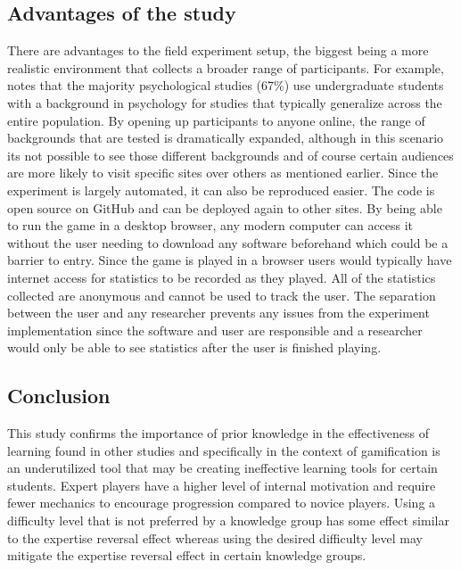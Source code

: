 \documentclass[letterpaper,man,natbib,floatsintext]{apa7}  %
\begin{document}
\subsection{Advantages of the study}
There are advantages to the field experiment setup, the biggest being a more realistic environment that collects a broader range of participants. For example, \cite{henrich2010weirdest} notes that the majority psychological studies (67\%)
use undergraduate students with a background in psychology for studies that typically generalize across the entire population. By opening up participants to anyone online, the range of backgrounds that are tested is dramatically expanded, although in this scenario its not possible to see those different backgrounds and of course certain audiences are more likely to visit specific sites over others as mentioned earlier. Since the experiment is largely automated, it
can also be reproduced easier. The code is open source on GitHub and can be deployed again to other sites. By being able 
to run the game in a desktop browser, any modern computer can access it without the user needing to download any software
beforehand which could be a barrier to entry. Since the game is played in a browser users would typically have internet access for statistics to be recorded as they played. All of the statistics collected are anonymous and cannot be used to 
track the user. The separation between the user and any researcher prevents any issues from the experiment implementation 
since the software and user are responsible and a researcher would only be able to see statistics after the user is 
finished playing.

\subsection{Conclusion}
This study confirms the importance of prior knowledge in the effectiveness of learning found in other studies and 
specifically in the context of gamification is an underutilized tool that may be creating ineffective learning tools 
for certain students. Expert players have a higher level of internal motivation and require fewer mechanics to 
encourage progression compared to novice players. Using a difficulty level that is not preferred by a knowledge group  has some effect similar to the expertise reversal effect whereas using the desired difficulty level may mitigate 
the expertise reversal effect in certain knowledge groups.
\end{document}

